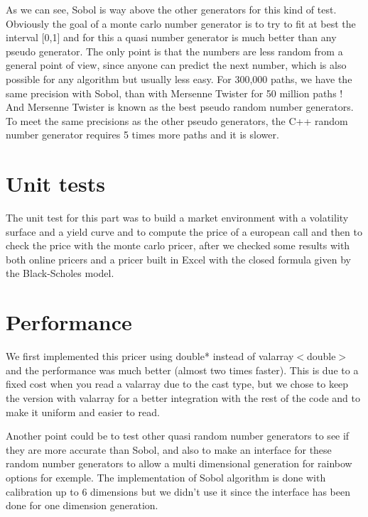 \bigskip

As we can see, Sobol is way above the other generators for this kind
of test. Obviously the goal of a monte carlo number generator is to
try to fit at best the interval [0,1] and for this a quasi number
generator is much better than any pseudo generator. The only point
is that the numbers are less random from a general point of view,
since anyone can predict the next number, which is also possible for
any algorithm but usually less easy. For 300,000 paths, we have the
same precision with Sobol, than with Mersenne Twister for 50 million
paths ! And Mersenne Twister is known as the best pseudo random
number generators.  To meet the same precisions as the other pseudo
generators, the C++ random number generator requires 5 times more
paths and it is slower.

\section{Unit tests}

The unit test for this part was to build a market environment with a volatility surface and a yield curve and to compute the price of a european call and then to check the price with the monte carlo pricer, after we checked some results with both online pricers and a pricer built in Excel with the closed formula given by the Black-Scholes model.

\section{Performance}

We first implemented this pricer using double* instead of valarray$<$double$>$ and the performance was much better (almost two times faster). This is due to a fixed cost when you read a valarray due to the cast type, but we chose to keep the version with valarray for a better integration with the rest of the code and to make it uniform and easier to read.

Another point could be to test other quasi random number generators
to see if they are more accurate than Sobol, and also to make an
interface for these random number generators to allow a multi
dimensional generation for rainbow options for exemple. The
implementation of Sobol algorithm is done with calibration up to 6
dimensions but we didn't use it since the interface has been done
for one dimension generation.

